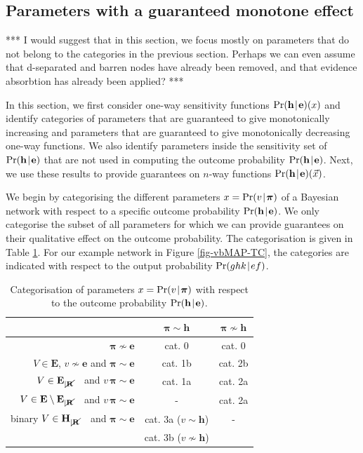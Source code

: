 \documentclass[10pt,a4paper]{paper}
\theoremstyle{definition}
\newcommand{\bpi}{\boldsymbol\pi}
\newcommand{\hyp}{\mathbf{h}}
\newcommand{\ev}{\mathbf{e}}
\newcommand{\hyps}{\mathbf{H}}
\newcommand{\evs}{\mathbf{E}}
\newcommand{\restr}{_{|\cancel{\bf R}}}
\newcommand{\newmid}{\hspace{0.9pt}\vert\hspace{0.9pt}}
\begin{document}
\subsection{Parameters with a guaranteed monotone effect}\label{sec:bayesian:guaranteedeffects}

{\color{red}*** I would suggest that in this section, we focus mostly on parameters that do not belong to the categories in the previous section. Perhaps we can even assume that d-separated and barren nodes have already been removed, and that evidence absorbtion has already been applied? ***}

In this section, we first consider one-way sensitivity functions $\Pr(\hyp \newmid \ev)(x)$ and identify categories of parameters that are guaranteed to give monotonically increasing and parameters that are guaranteed to give monotonically decreasing one-way functions. 
We also identify parameters inside the sensitivity set of $\Pr(\hyp \newmid \ev)$ that are not used in computing the outcome probability $\Pr(\hyp \newmid \ev)$. 
Next, we use these results to provide guarantees on $n$-way functions $\Pr(\hyp \newmid \ev)(\vec{x})$. 

We begin by categorising the different parameters $x=\Pr(v\newmid \bpi)$ of a Bayesian network with respect to a specific outcome probability $\Pr(\hyp\newmid\ev)$. We only categorise the subset of all parameters for which we can provide guarantees on their qualitative effect on the outcome probability. The categorisation is given in Table \ref{cat}. For our example network in Figure \ref{fig-vbMAP-TC}, the categories are indicated with respect to the output probability \mbox{$\Pr(ghk\newmid ef)$}. 


\begin{table}
\begin{center}
\caption{Categorisation of parameters $x=\Pr(v\newmid \bpi)$ with respect to the outcome probability $\Pr(\hyp\newmid\ev)$.}
\vspace{8pt}
\begin{tabular}{r||c|c}
& $\bpi \sim \hyp$ & $\bpi\nsim \hyp$\\
\hline\hline
$\bpi\nsim \ev$ & cat. 0 & cat. 0\\
\hline
$V \in\evs$, $v\nsim \ev$ and $\bpi\sim \ev$& cat. 1b & cat. 2b\\
\hline
$V\in\evs\restr$~~and $v\,\bpi \sim \ev$ & cat. 1a & cat. 2a\\
\hline
$V \in\evs\setminus\evs\restr$~~and $v\,\bpi \sim \ev$ & - & cat. 2a\\
\hline
binary $V \in\hyps\restr$~~and $\bpi \sim \ev$ & cat. 3a ($v\sim \hyp$) & -\\
 & cat. 3b ($v\nsim \hyp$) & 
\label{cat}
\end{tabular}
\end{center}
\end{table}
\end{document}
